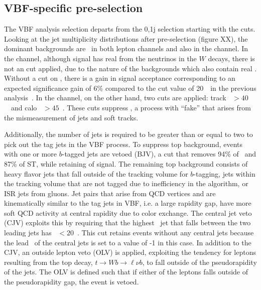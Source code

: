 
\subsection{VBF-specific pre-selection}
\label{subsec:vbf_select}

The VBF analysis selection departs from the 0,1j selection starting
with the \etmiss cuts. Looking at the jet multiplicity distributions
after pre-selection (figure XX), the dominant backgrounds are \ttbar~in
both lepton channels and also \ZDY in the \eemm channel. In the \emme
channel, although signal has real \etmiss from the neutrinos in the
$W$ decays, there is not an \etmiss cut applied, due to the nature of
the backgrounds which also contain real \etmiss. Without a cut on
\etmiss, there is a gain in signal acceptance corresponding to an expected
significance gain of 6\% compared to the cut value of 20~\gev~in the previous
analysis~\cite{bib:hww_moriond_2013}. In the \eemm channel, on the other hand, two cuts are
applied: track \etmiss~$>40$~\gev~and calo \etmiss~$>45$~\gev. These
cuts suppress \ZDY, a process with ``fake'' \etmiss that arises from
the mismeasurement of jets and soft tracks. 

Additionally, the number of jets is required to be greater than or
equal to two to pick out the tag jets in the VBF process. To suppress
top background, events with one or more $b$-tagged jets are vetoed
(BJV), a cut that removes 94\% of \ttbar~and 87\% of ST, while
retaining  of signal. The remaining top background
consists of heavy flavor jets that fall outside of the tracking volume for
$b$-tagging, jets within the tracking volume that are not tagged due
to inefficiency in the algorithm, or ISR jets from gluons. Jet pairs
that arise from QCD vertices and are kinematically similar to the tag jets in VBF, i.e. a large
rapidity gap, have more soft QCD activity at central rapidity due to
color exchange. The central jet veto (CJV) exploits this by requiring
that the highest \pt~jet that falls between the two leading jets has
\pt~$<20$~\gev. This cut retains events without any central jets
because the lead \pt~of the central jets is set to a value of -1 in
this case. In addition to the CJV, an outside lepton veto (OLV) is
applied, exploiting the tendency for leptons resulting from the top decay,
$t\rightarrow{Wb}\rightarrow{\ell\nu b}$, to fall outside of the
pseudorapidity of the jets. The OLV is defined such that if either of
the leptons falls outside of the pseudorapidity gap, the event is
vetoed. 


